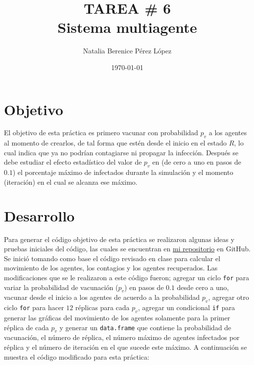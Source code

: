 \documentclass{article}
\title{TAREA \# 6 \\ Sistema multiagente} %
\author{Natalia Berenice P\'{e}rez L\'{o}pez} %
\date{\today}
\begin{document}

\maketitle %

\section{Objetivo}
El objetivo de esta práctica es primero vacunar con probabilidad $p_v$ a los agentes al momento de crearlos, de tal forma que estén desde el inicio en el estado $R$, lo cual indica que ya no podrían contagiarse ni propagar la infección. Después se debe estudiar el efecto estadístico del valor de $p_v$ en (de cero a uno en pasos de $0.1$) el porcentaje máximo de infectados durante la simulación y el momento (iteración) en el cual se alcanza ese máximo.

\section{Desarrollo} %
Para generar el código objetivo de esta práctica se realizaron algunas ideas y pruebas iniciales del código, las cuales se encuentran en \href{https://github.com/nataliaperez0/Simulation/tree/main/Tarea6}{mi repositorio}  en GitHub. Se inició tomando como base el código revisado en clase \citep{1} para calcular el movimiento de los agentes, los contagios y los agentes recuperados. Las modificaciones que se le realizaron a este código fueron; agregar un ciclo \texttt{for} para variar la probabilidad de vacunación ($p_v$) en pasos de $0.1$ desde cero a uno, vacunar desde el inicio a los agentes de acuerdo a la probabilidad $p_v$, agregar otro ciclo \texttt{for} para hacer $12$ réplicas para cada $p_v$, agregar un condicional \texttt{if} para generar las gráficas del movimiento de los agentes solamente para la primer réplica de cada $p_v$ y generar un \texttt{data.frame} que contiene la probabilidad de vacunación, el número de réplica, el número máximo de agentes infectados por réplica y el número de iteración en el que sucede este máximo. A continuación se muestra el código modificado para esta práctica: 
\bigskip


\end{document}
